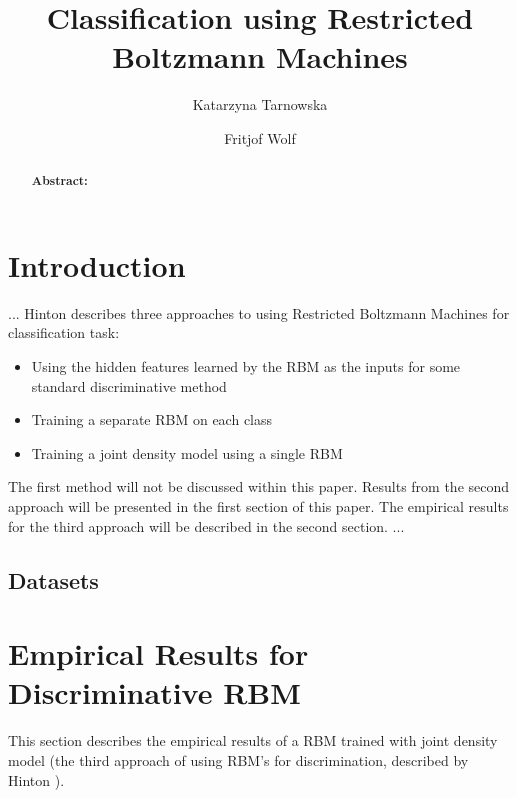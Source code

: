 \documentclass[a4paper]{scrartcl}
\begin{document}
\title{Classification using Restricted Boltzmann Machines}
\author{Katarzyna Tarnowska \and Fritjof Wolf}
\maketitle
\newpage
\begin{abstract}
\textbf{Abstract:} 
\end{abstract}

\section{Introduction}
...
Hinton \cite{Hinton} describes three approaches to using Restricted Boltzmann Machines for classification task:
\begin{itemize}
    \item Using the hidden features learned by the RBM as the inputs for some standard discriminative method
    \item Training a separate RBM on each class
	\item Training a joint density model using a single RBM
\end{itemize}
The first method will not be discussed within this paper. Results from the second approach will be presented in the first section of this paper. The empirical results for the third approach will be described in the second section.
...
\subsection{Datasets}

\section{Empirical Results for Discriminative RBM}
This section describes the empirical results of a RBM trained with joint density model (the third approach of using RBM's for discrimination, described by Hinton \cite{Hinton}).
\end{document}
